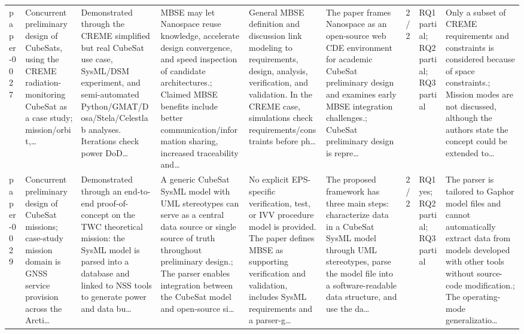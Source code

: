 \documentclass[10pt]{article}
\begin{document}
\begin{landscape}
\begin{longtable}{p{1.0cm}p{2.4cm}p{3.1cm}p{3.7cm}p{3.4cm}p{3.1cm}p{1.0cm}p{1.8cm}p{3.4cm}}
paper-0027 & Concurrent preliminary design of CubeSats, using the CREME radiation-monitoring CubeSat as a case study; mission/orbit,… & Demonstrated through the CREME simplified but real CubeSat use case, SysML/DSM experiment, and semi-automated Python/GMAT/Dosa/Stela/Celestlab analyses. Iterations check power DoD… & MBSE may let Nanospace reuse knowledge, accelerate design convergence, and speed inspection of candidate architectures.; Claimed MBSE benefits include better communication/information sharing, increased traceability and… & General MBSE definition and discussion link modeling to requirements, design, analysis, verification, and validation. In the CREME case, simulations check requirements/constraints before ph… & The paper frames Nanospace as an open-source web CDE environment for academic CubeSat preliminary design and examines early MBSE integration challenges.; CubeSat preliminary design is repre… & 2/2 & RQ1 partial; RQ2 partial; RQ3 partial & Only a subset of CREME requirements and constraints is considered because of space constraints.; Mission modes are not discussed, although the authors state the concept could be extended to… \\
paper-0029 & Concurrent preliminary design of CubeSat missions; case-study mission domain is GNSS service provision across the Arcti… & Demonstrated through an end-to-end proof-of-concept on the TWC theoretical mission: the SysML model is parsed into a database and linked to NSS tools to generate power and data bu… & A generic CubeSat SysML model with UML stereotypes can serve as a central data source or single source of truth throughout preliminary design.; The parser enables integration between the CubeSat model and open-source si… & No explicit EPS-specific verification, test, or IVV procedure model is provided. The paper defines MBSE as supporting verification and validation, includes SysML requirements and a parser-g… & The proposed framework has three main steps: characterize data in a CubeSat SysML model through UML stereotypes, parse the model file into a software-readable data structure, and use the da… & 2/2 & RQ1 yes; RQ2 partial; RQ3 partial & The parser is tailored to Gaphor model files and cannot automatically extract data from models developed with other tools without source-code modification.; The operating-mode generalizatio… \\

\end{longtable}
\end{landscape}
\end{document}
